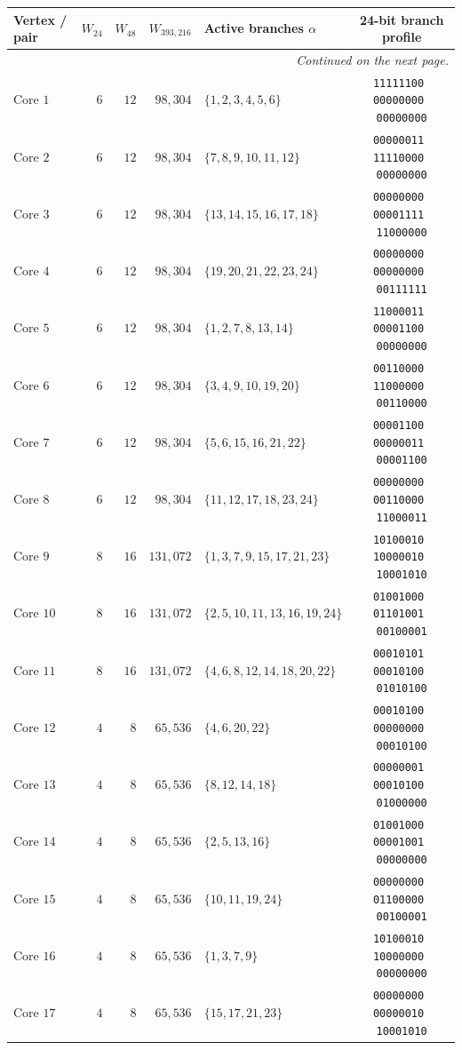 \documentclass[aps,pra,reprint,superscriptaddress,longbibliography,nofootinbib,floatfix,10pt]{revtex4-2}
\theoremstyle{definition}
\begin{document}
\begin{longtable}{lrrrlc}
Vertex / pair & $W_{24}$ & $W_{48}$ & $W_{393{,}216}$ & Active branches $\alpha$ & 24-bit branch profile \\\midrule
\endhead
\midrule
\multicolumn{6}{r}{\emph{Continued on the next page.}}\\
\endfoot
\bottomrule\endlastfoot
Core $1$ & $6$ & $12$ & $98{,}304$ & $\{1,2,3,4,5,6\}$ & \texttt{11111100\,00000000\,00000000} \\
Core $2$ & $6$ & $12$ & $98{,}304$ & $\{7,8,9,10,11,12\}$ & \texttt{00000011\,11110000\,00000000} \\
Core $3$ & $6$ & $12$ & $98{,}304$ & $\{13,14,15,16,17,18\}$ & \texttt{00000000\,00001111\,11000000} \\
Core $4$ & $6$ & $12$ & $98{,}304$ & $\{19,20,21,22,23,24\}$ & \texttt{00000000\,00000000\,00111111} \\
Core $5$ & $6$ & $12$ & $98{,}304$ & $\{1,2,7,8,13,14\}$ & \texttt{11000011\,00001100\,00000000} \\
Core $6$ & $6$ & $12$ & $98{,}304$ & $\{3,4,9,10,19,20\}$ & \texttt{00110000\,11000000\,00110000} \\
Core $7$ & $6$ & $12$ & $98{,}304$ & $\{5,6,15,16,21,22\}$ & \texttt{00001100\,00000011\,00001100} \\
Core $8$ & $6$ & $12$ & $98{,}304$ & $\{11,12,17,18,23,24\}$ & \texttt{00000000\,00110000\,11000011} \\
Core $9$ & $8$ & $16$ & $131{,}072$ & $\{1,3,7,9,15,17,21,23\}$ & \texttt{10100010\,10000010\,10001010} \\
Core $10$ & $8$ & $16$ & $131{,}072$ & $\{2,5,10,11,13,16,19,24\}$ & \texttt{01001000\,01101001\,00100001} \\
Core $11$ & $8$ & $16$ & $131{,}072$ & $\{4,6,8,12,14,18,20,22\}$ & \texttt{00010101\,00010100\,01010100} \\
Core $12$ & $4$ & $8$ & $65{,}536$ & $\{4,6,20,22\}$ & \texttt{00010100\,00000000\,00010100} \\
Core $13$ & $4$ & $8$ & $65{,}536$ & $\{8,12,14,18\}$ & \texttt{00000001\,00010100\,01000000} \\
Core $14$ & $4$ & $8$ & $65{,}536$ & $\{2,5,13,16\}$ & \texttt{01001000\,00001001\,00000000} \\
Core $15$ & $4$ & $8$ & $65{,}536$ & $\{10,11,19,24\}$ & \texttt{00000000\,01100000\,00100001} \\
Core $16$ & $4$ & $8$ & $65{,}536$ & $\{1,3,7,9\}$ & \texttt{10100010\,10000000\,00000000} \\
Core $17$ & $4$ & $8$ & $65{,}536$ & $\{15,17,21,23\}$ & \texttt{00000000\,00000010\,10001010} \\ \hline

\end{longtable}
\end{document}
